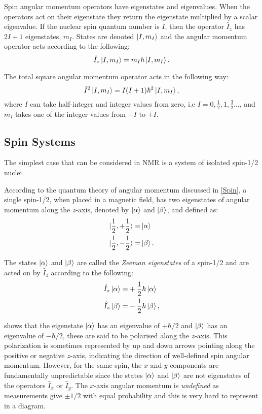 Spin angular momentum operators have eigenstates and eigenvalues. When the operators act on their eigenstate
they return the eigenstate multiplied by a scalar eigenvalue. If the nuclear spin quantum number is $I$, then the operator $\hat{I}_z$ has $2I+1$
eigenstates, $m_I$. States are denoted $\ket{I,m_I}$ \citep{dirac_1939} and the angular momentum operator acts according to the following:
\begin{equation}
  \hat{I}_z\ket{I,m_I} = m_I\hbar\ket{I,m_I}.
\end{equation}

The total square angular momentum operator acts in the following way:
\begin{equation}
  \hat{I}^2\ket{I,m_I} = I(I+1)\hbar^2\ket{I,m_I},
\end{equation}
where $I$ can take half-integer and integer values from zero, i.e
$I = 0,\frac{1}{2},1,\frac{3}{2}\dots$, and $m_I$ takes one of the integer values from
$-I$ to $+I$.

\subsection{Spin Systems}\label{SpinStates}

The simplest case that can be considered in NMR is a system of isolated
spin-1/2 nuclei.

According to the quantum theory of angular momentum discussed in \ref{Spin}, a
single spin-1/2, when placed in a magnetic field, has two eigenstates of angular
momentum along the $z$-axis, denoted by $\ket{\alpha}$ and $\ket{\beta}$, and defined
as:
\begin{align}
  \ket{\frac{1}{2},+\frac{1}{2}} =& \ket{\alpha}\\
  \ket{\frac{1}{2},-\frac{1}{2}} =& \ket{\beta}.
 \end{align}

The states $\ket{\alpha}$ and $\ket{\beta}$ are called the \textit{Zeeman eigenstates}
of a spin-1/2 and are acted on by $\hat{I}_z$ according to the following:
\begin{align}\label{eqn:momentum}
  \hat{I}_z\ket{\alpha} =& +\frac{1}{2}\hbar\ket{\alpha}\\
  \hat{I}_z\ket{\beta} =& -\frac{1}{2}\hbar\ket{\beta},
\end{align}

 shows that the eigenstate $\ket{\alpha}$ has an eigenvalue of
$+\hbar/2$ and $\ket{\beta}$ has an eigenvalue of $-\hbar/2$, these are said to
be polarised along the $z$-axis. This polarization is sometimes represented
by  up and down arrows pointing along the positive
or negative $z$-axis, indicating the direction of well-defined spin angular momentum.
However, for the same spin,
the $x$ and $y$ components are fundamentally unpredictable
since the states $\ket{\alpha}$ and $\ket{\beta}$ are not eigenstates of the operators
$\hat{I}_x$ or $\hat{I}_y$. The $x$-axis angular momentum is \textit{undefined}
as measurements give $±1/2$ with equal probability and this is very hard to represent
in a diagram.


